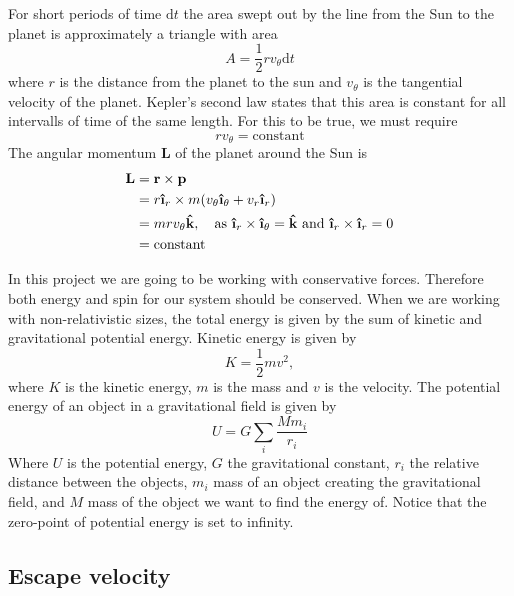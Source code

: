 \documentclass[reprint, english,notitlepage,nofootinbib]{revtex4-1}  %
\newcommand{\ihat}{\boldsymbol{\hat{\textbf{\i}}}}
\newcommand{\khat}{\boldsymbol{\hat{\textbf{k}}}}
\newcommand{\vc}[1]{\mathbf{#1}}
\begin{document}
For short periods of time $\mathrm d t$ the area swept out by the line from the Sun to the planet is approximately a triangle with area
\begin{equation*}
  A = \frac{1}{2} r v_\theta \mathrm dt
\end{equation*}
where $r$ is the distance from the planet to the sun and $v_\theta$ is the tangential velocity of the planet. Kepler's second law states that this area is constant for all intervalls of time of the same length. For this to be true, we must require
\begin{equation*}
  r v_\theta = \text{constant}
\end{equation*}
The angular momentum $\vc L$ of the planet around the Sun is
\begin{align*}
  \vc L &= \vc r \times \vc p \\
  &= r \ihat_r \times m(v_\theta \ihat_\theta + v_r \ihat_r) \\
  &= m r v_\theta \khat, \quad \text{as } \ihat_r \times \ihat_\theta = \khat \text{ and } \ihat_r \times \ihat_r = 0 \\
  &= \text{constant}
\end{align*}

In this project we are going to be working with conservative forces. Therefore both energy and spin for our system should be conserved. When we are working with non-relativistic sizes, the total energy is given by the sum of kinetic and gravitational potential energy. Kinetic energy is given by
\begin{equation}
\label{eq:kinetic_energy}
K = \frac{1}{2}mv^2,
\end{equation}
where $K$ is the kinetic energy, $m$ is the mass and $v$ is the velocity. The potential energy of an object in a gravitational field is given by
\begin{equation}
\label{eq:potential_energy}
U = G\sum_{i}\frac{Mm_i}{r_i}
\end{equation}
Where $U$ is the potential energy, $G$ the gravitational constant, $r_i$ the relative distance between the objects, $m_i$ mass of an object creating the gravitational field, and $M$ mass of the object we want to find the energy of. Notice that the zero-point of potential energy is set to infinity.

\subsection{Escape velocity}
\end{document}
